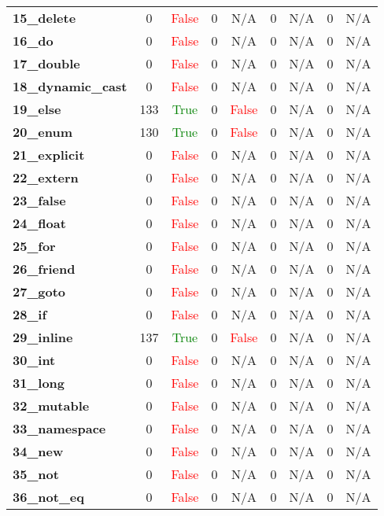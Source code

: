 \documentclass{article}
\begin{document}
\begin{xltabular}{\textwidth}{lcccccccc}
\textbf{15\_delete}& 0&\textcolor{red}{False}& 0&N/A& 0&N/A& 0&N/A \\[0.5ex]
\textbf{16\_do}& 0&\textcolor{red}{False}& 0&N/A& 0&N/A& 0&N/A \\[0.5ex]
\textbf{17\_double}& 0&\textcolor{red}{False}& 0&N/A& 0&N/A& 0&N/A \\[0.5ex]
\textbf{18\_dynamic\_cast}& 0&\textcolor{red}{False}& 0&N/A& 0&N/A& 0&N/A \\[0.5ex]
\textbf{19\_else}& 133&\textcolor{green}{True}& 0&\textcolor{red}{False}& 0&N/A& 0&N/A \\[0.5ex]
\textbf{20\_enum}& 130&\textcolor{green}{True}& 0&\textcolor{red}{False}& 0&N/A& 0&N/A \\[0.5ex]
\textbf{21\_explicit}& 0&\textcolor{red}{False}& 0&N/A& 0&N/A& 0&N/A \\[0.5ex]
\textbf{22\_extern}& 0&\textcolor{red}{False}& 0&N/A& 0&N/A& 0&N/A \\[0.5ex]
\textbf{23\_false}& 0&\textcolor{red}{False}& 0&N/A& 0&N/A& 0&N/A \\[0.5ex]
\textbf{24\_float}& 0&\textcolor{red}{False}& 0&N/A& 0&N/A& 0&N/A \\[0.5ex]
\textbf{25\_for}& 0&\textcolor{red}{False}& 0&N/A& 0&N/A& 0&N/A \\[0.5ex]
\textbf{26\_friend}& 0&\textcolor{red}{False}& 0&N/A& 0&N/A& 0&N/A \\[0.5ex]
\textbf{27\_goto}& 0&\textcolor{red}{False}& 0&N/A& 0&N/A& 0&N/A \\[0.5ex]
\textbf{28\_if}& 0&\textcolor{red}{False}& 0&N/A& 0&N/A& 0&N/A \\[0.5ex]
\textbf{29\_inline}& 137&\textcolor{green}{True}& 0&\textcolor{red}{False}& 0&N/A& 0&N/A \\[0.5ex]
\textbf{30\_int}& 0&\textcolor{red}{False}& 0&N/A& 0&N/A& 0&N/A \\[0.5ex]
\textbf{31\_long}& 0&\textcolor{red}{False}& 0&N/A& 0&N/A& 0&N/A \\[0.5ex]
\textbf{32\_mutable}& 0&\textcolor{red}{False}& 0&N/A& 0&N/A& 0&N/A \\[0.5ex]
\textbf{33\_namespace}& 0&\textcolor{red}{False}& 0&N/A& 0&N/A& 0&N/A \\[0.5ex]
\textbf{34\_new}& 0&\textcolor{red}{False}& 0&N/A& 0&N/A& 0&N/A \\[0.5ex]
\textbf{35\_not}& 0&\textcolor{red}{False}& 0&N/A& 0&N/A& 0&N/A \\[0.5ex]
\textbf{36\_not\_eq}& 0&\textcolor{red}{False}& 0&N/A& 0&N/A& 0&N/A \\[0.5ex]

\end{xltabular}
\end{document}
